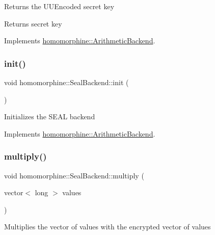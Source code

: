 Returns the U\+U\+Encoded secret key

\begin{DoxyReturn}{Returns}
secret key 
\end{DoxyReturn}


Implements \mbox{\hyperlink{classhomomorphine_1_1_arithmetic_backend_a679abf60fea83922f7972498c4500252}{homomorphine\+::\+Arithmetic\+Backend}}.

\mbox{\label{classhomomorphine_1_1_seal_backend_a106556100ae5f2e9dadfa9fc64603d94}} 
\subsubsection{\texorpdfstring{init()}{init()}}
{\footnotesize\ttfamily void homomorphine\+::\+Seal\+Backend\+::init (\begin{DoxyParamCaption}{ }\end{DoxyParamCaption})\hspace{0.3cm}{\ttfamily [virtual]}}

Initializes the S\+E\+AL backend 

Implements \mbox{\hyperlink{classhomomorphine_1_1_arithmetic_backend_a2654ee62a6cf2f16fd41c834a26b0006}{homomorphine\+::\+Arithmetic\+Backend}}.

\mbox{\label{classhomomorphine_1_1_seal_backend_ace0bb8cd6a0e4b22f6e3e7ab00ea1197}} 
\subsubsection{\texorpdfstring{multiply()}{multiply()}\hspace{0.1cm}{\footnotesize\ttfamily [1/2]}}
{\footnotesize\ttfamily void homomorphine\+::\+Seal\+Backend\+::multiply (\begin{DoxyParamCaption}\item[{vector$<$ long $>$}]{values }\end{DoxyParamCaption})\hspace{0.3cm}{\ttfamily [virtual]}}

Multiplies the vector of values with the encrypted vector of values


